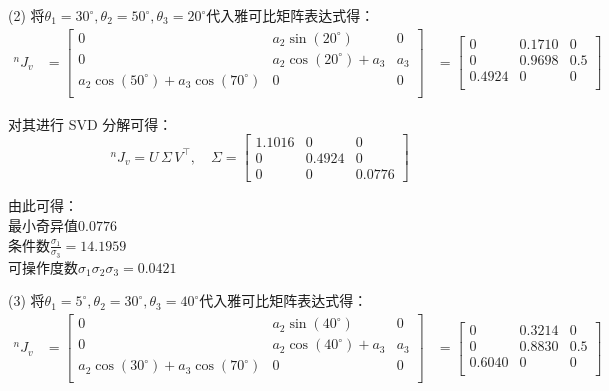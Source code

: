 \documentclass[UTF8, 12pt]{ctexart}
\begin{document}
(2)
将\(\theta_1 = 30^\circ, \theta_2 = 50^\circ, \theta_3 = 20^\circ\)代入雅可比矩阵表达式得：
\[
\begin{aligned}
{}^n J_v &= \begin{bmatrix}
                0 & a_2\sin(20^\circ) & 0 \\
                0 & a_2\cos(20^\circ) + a_3 & a_3 \\
                a_2\cos(50^\circ) + a_3\cos(70^\circ) & 0 & 0 \\
            \end{bmatrix}
        &= \begin{bmatrix}
                0 & 0.1710 & 0 \\
                0 & 0.9698 & 0.5 \\
                0.4924 & 0 & 0 \\
            \end{bmatrix}
\end{aligned}
\]

对其进行 SVD 分解可得：
\[
{}^n J_v = U\, \Sigma\, V^{\top},\quad
\Sigma = \begin{bmatrix}
            1.1016 & 0 & 0 \\
            0 & 0.4924 & 0 \\
            0 & 0 & 0.0776
        \end{bmatrix}
\]

由此可得： \\
最小奇异值\(0.0776\) \\
条件数\(\frac{\sigma_1}{\sigma_3} = 14.1959\) \\
可操作度数\(\sigma_1 \sigma_2 \sigma_3 = 0.0421\)
\vspace{5em}


(3)
将\(\theta_1 = 5^\circ, \theta_2 = 30^\circ, \theta_3 = 40^\circ\)代入雅可比矩阵表达式得：
\[
\begin{aligned}
{}^n J_v &= \begin{bmatrix}
                0 & a_2\sin(40^\circ) & 0 \\
                0 & a_2\cos(40^\circ) + a_3 & a_3 \\
                a_2\cos(30^\circ) + a_3\cos(70^\circ) & 0 & 0 \\
            \end{bmatrix}
        &= \begin{bmatrix}
                0 & 0.3214 & 0 \\
                0 & 0.8830 & 0.5 \\
                0.6040 & 0 & 0 \\
            \end{bmatrix}
\end{aligned}
\]
\end{document}
